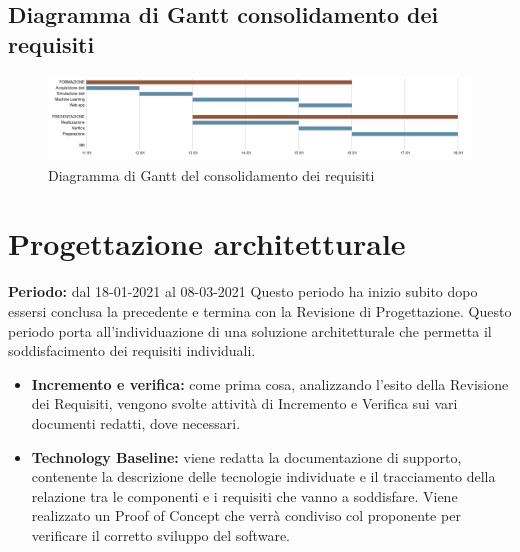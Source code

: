 \subsection{Diagramma di Gantt consolidamento dei requisiti}\label{PianificazioneDiagrammaDiGanttConsolidamento}
\begin{figure}[!ht]
	\begin{center}
		\includegraphics[width=1\linewidth]{../immagini/pdp/gantt_consolidamento_requisiti.png}
		\caption{Diagramma di Gantt del consolidamento dei requisiti}
	\end{center}
\end{figure}
\section{Progettazione architetturale}\label{PianificazioneProgettazioneArchitetturale}
\textbf{Periodo:} dal 18-01-2021 al 08-03-2021
Questo periodo ha inizio subito dopo essersi conclusa la precedente e termina con la Revisione di Progettazione.
Questo periodo porta all'individuazione di una soluzione architetturale che permetta il soddisfacimento dei requisiti individuali.
\begin{itemize}
	\item \textbf{Incremento e verifica:} come prima cosa, analizzando l'esito della Revisione dei Requisiti, vengono svolte attività di Incremento e Verifica sui vari documenti redatti, dove necessari.
	\item \textbf{Technology Baseline:} viene redatta la documentazione di supporto, contenente la descrizione delle tecnologie individuate e il tracciamento della relazione tra le componenti e i requisiti che vanno a soddisfare.
	Viene realizzato un Proof of Concept che verrà condiviso col proponente per verificare il corretto sviluppo del software.
\end{itemize}
